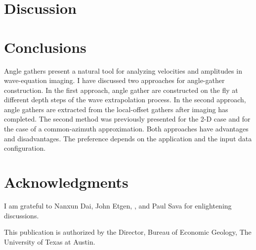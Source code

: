 \section{Discussion}


\section{Conclusions}

Angle gathers present a natural tool for analyzing velocities and
amplitudes in wave-equation imaging. I have discussed two approaches
for angle-gather construction. In the first approach, angle gather are
constructed on the fly at different depth steps of the wave
extrapolation process. In the second approach, angle gathers are
extracted from the local-offset gathers after imaging has
completed. The second method was previously presented for the 2-D case
and for the case of a common-azimuth approximation. Both approaches
have advantages and disadvantages. The preference depends on the
application and the input data configuration.


\section{Acknowledgments}

I am grateful to Nanxun Dai, John Etgen, , and Paul Sava
for enlightening discussions. 

This publication is authorized by the Director, Bureau of Economic
Geology, The University of Texas at Austin.





